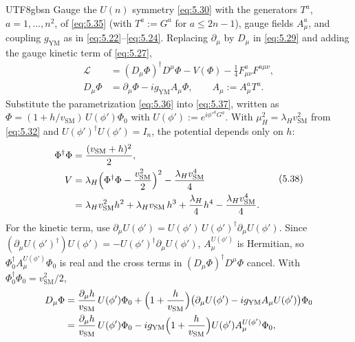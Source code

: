 \documentclass[11pt,a4paper,oneside]{report}
\begin{document}
\begin{CJK*}{UTF8}{gbsn}
Gauge the $U(n)$ symmetry \eqref{eq:5.30} with the generators $T^a$, $a=1,\ldots,n^2$, of \eqref{eq:5.35} (with $T^a:=G^a$ for $a\le2n-1$), gauge fields $A_\mu^a$, and coupling $g_{\mathrm{YM}}$ as in \eqref{eq:5.22}–\eqref{eq:5.24}. Replacing $\partial_\mu$ by $D_\mu$ in \eqref{eq:5.29} and adding the gauge kinetic term of \eqref{eq:5.27},
\begin{equation*}
{\displaystyle 
\begin{aligned}
\mathcal L&=(D_\mu\Phi)^\dagger D^\mu\Phi-V(\Phi)-\frac14F_{\mu\nu}^aF^{a\mu\nu},\\
D_\mu\Phi&=\partial_\mu\Phi-ig_{\mathrm{YM}}A_\mu\Phi,\qquad A_\mu:=A_\mu^aT^a .
\end{aligned}
}
\tag{5.37}\label{eq:5.37}
\end{equation*}
Substitute the parametrization \eqref{eq:5.36} into \eqref{eq:5.37}, written as $\Phi=(1+h/v_{\mathrm{SM}})\,U(\phi')\Phi_0$ with $U(\phi'):=e^{i\phi'^aG^a}$. With $\mu_H^2=\lambda_Hv_{\mathrm{SM}}^2$ from \eqref{eq:5.32} and $U(\phi')^\dagger U(\phi')=I_n$, the potential depends only on $h$:
\begin{equation*}
\begin{aligned}
\Phi^\dagger\Phi&=\frac{(v_{\mathrm{SM}}+h)^2}2,\\
V&=\lambda_H\Bigl(\Phi^\dagger\Phi-\frac{v_{\mathrm{SM}}^2}2\Bigr)^2-\frac{\lambda_Hv_{\mathrm{SM}}^4}4\\
&=\lambda_Hv_{\mathrm{SM}}^2h^2+\lambda_Hv_{\mathrm{SM}}\,h^3+\frac{\lambda_H}4h^4-\frac{\lambda_Hv_{\mathrm{SM}}^4}4 .
\end{aligned}
\tag{5.38}\label{eq:5.38}
\end{equation*}
For the kinetic term, use $\partial_\mu U(\phi')=U(\phi')\,U(\phi')^\dagger\partial_\mu U(\phi')$. Since $(\partial_\mu U(\phi')^\dagger)U(\phi')=-U(\phi')^\dagger\partial_\mu U(\phi')$, $A^{U(\phi')}_\mu$ is Hermitian, so $\Phi_0^\dagger A^{U(\phi')}_\mu\Phi_0$ is real and the cross terms in $(D_\mu\Phi)^\dagger D^\mu\Phi$ cancel. With $\Phi_0^\dagger\Phi_0=v_{\mathrm{SM}}^2/2$,
\begin{equation*}
\begin{aligned}
D_\mu\Phi&=\frac{\partial_\mu h}{v_{\mathrm{SM}}}\,U(\phi')\Phi_0+\Bigl(1+\frac h{v_{\mathrm{SM}}}\Bigr)\bigl(\partial_\mu U(\phi')-ig_{\mathrm{YM}}A_\mu U(\phi')\bigr)\Phi_0\\
&=\frac{\partial_\mu h}{v_{\mathrm{SM}}}\,U(\phi')\Phi_0-ig_{\mathrm{YM}}\Bigl(1+\frac h{v_{\mathrm{SM}}}\Bigr)U(\phi')A^{U(\phi')}_\mu\Phi_0,\\

\end{aligned}
\end{equation*}
\end{CJK*}
\end{document}
